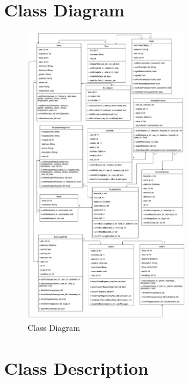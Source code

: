 \baselineskip=8mm
\renewcommand{\thesubsection}{\arabic{subsection}.}
\renewcommand{\theequation}{\thesection.\arabic{equation}}
\renewcommand{\thesection}{}
\renewcommand{\thesubsubsection}{\thesubsection\arabic{subsubsection}.}



\section{Class Diagram}

\vspace{1cm}

\begin{figure}[h]
    \centering
    \includegraphics[width=0.63\textwidth]{Class Diagram.png}
    \caption{Class Diagram}
    \end{figure}

\clearpage




\section{Class Description}